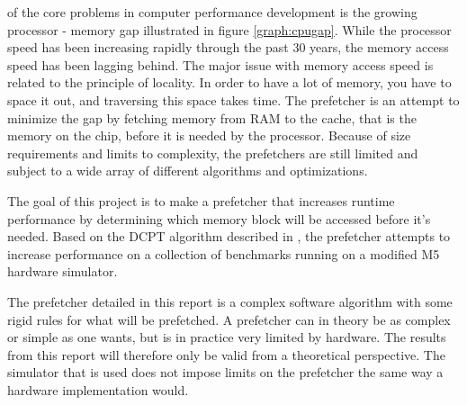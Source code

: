  of the core problems in computer performance development is the growing processor - memory gap illustrated in figure \ref{graph:cpugap}. While the processor speed has been increasing rapidly through the past 30 years, the memory access speed has been lagging behind. The major issue with memory access speed is related to the principle of locality. In order to have a lot of memory, you have to space it out, and traversing this space takes time. The prefetcher is an attempt to minimize the gap by fetching memory from RAM to the cache, that is the memory on the chip, before it is needed by the processor. Because of size requirements and limits to complexity, the prefetchers are still limited and subject to a wide array of different algorithms and optimizations.

The goal of this project is to make a prefetcher that increases runtime performance by determining which memory block will be accessed before it's needed. Based on the DCPT algorithm described in \cite{reference:jahre}, the prefetcher attempts to increase performance on a collection of benchmarks running on a modified M5 hardware simulator. 

The prefetcher detailed in this report is a complex software algorithm with some rigid rules for what will be prefetched. A prefetcher can in theory be as complex or simple as one wants, but is in practice very limited by hardware. The results from this report will therefore only be valid from a theoretical perspective. The simulator that is used does not impose limits on the prefetcher the same way a hardware implementation would.
